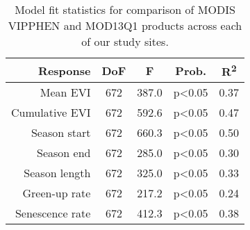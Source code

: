 \begin{table}[h]
\centering
\begin{tabular}{rcccc}
  \hline
Response & DoF & F & Prob. & R\textsuperscript{2} \\ 
  \hline
Mean EVI & 672 & 387.0 & p<0.05 & 0.37 \\ 
  Cumulative EVI & 672 & 592.6 & p<0.05 & 0.47 \\ 
  Season start & 672 & 660.3 & p<0.05 & 0.50 \\ 
  Season end & 672 & 285.0 & p<0.05 & 0.30 \\ 
  Season length & 672 & 325.0 & p<0.05 & 0.33 \\ 
  Green-up rate & 672 & 217.2 & p<0.05 & 0.24 \\ 
  Senescence rate & 672 & 412.3 & p<0.05 & 0.38 \\ 
   \hline
\end{tabular}
\caption{Model fit statistics for comparison of MODIS VIPPHEN and MOD13Q1 products across each of our study sites.} 
\label{phen:annot_df}
\end{table}

